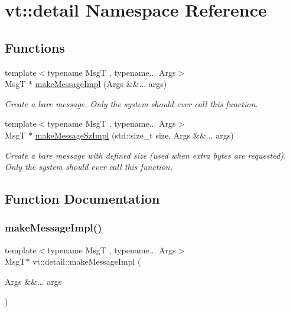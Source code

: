 \hypertarget{namespacevt_1_1detail}{}\section{vt\+:\+:detail Namespace Reference}
\label{namespacevt_1_1detail}
\subsection*{Functions}
\begin{DoxyCompactItemize}
\item 
{\footnotesize template$<$typename MsgT , typename... Args$>$ }\\MsgT $\ast$ \hyperlink{namespacevt_1_1detail_a5713d74f228ce37ce4b41646d7309c89}{make\+Message\+Impl} (Args \&\&... args)
\begin{DoxyCompactList}\small\item\em Create a bare message. Only the system should ever call this function. \end{DoxyCompactList}\item 
{\footnotesize template$<$typename MsgT , typename... Args$>$ }\\MsgT $\ast$ \hyperlink{namespacevt_1_1detail_adbb2053e6c7d3f6ef6abcf79ac61a585}{make\+Message\+Sz\+Impl} (std\+::size\+\_\+t size, Args \&\&... args)
\begin{DoxyCompactList}\small\item\em Create a bare message with defined size (used when extra bytes are requested). Only the system should ever call this function. \end{DoxyCompactList}\end{DoxyCompactItemize}


\subsection{Function Documentation}
\mbox{\label{namespacevt_1_1detail_a5713d74f228ce37ce4b41646d7309c89}} 
\subsubsection{\texorpdfstring{make\+Message\+Impl()}{makeMessageImpl()}}
{\footnotesize\ttfamily template$<$typename MsgT , typename... Args$>$ \\
MsgT$\ast$ vt\+::detail\+::make\+Message\+Impl (\begin{DoxyParamCaption}\item[{Args \&\&...}]{args }\end{DoxyParamCaption})}



